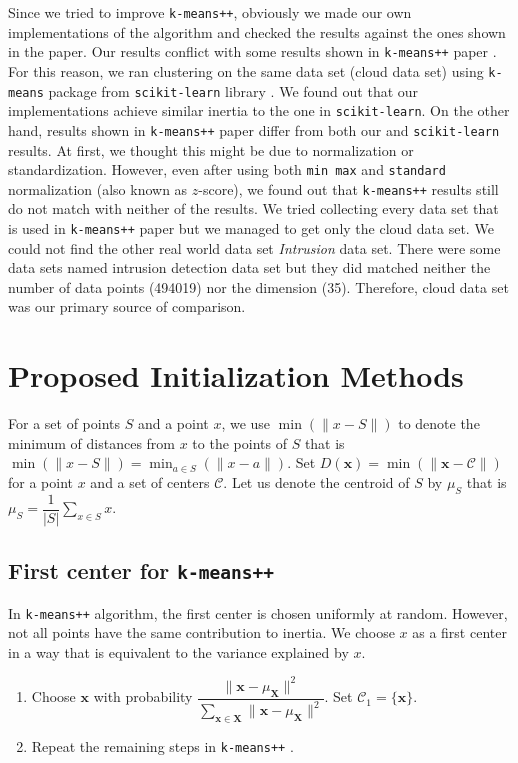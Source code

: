\documentclass[twoside, 11pt]{article}
\newcommand{\x}{\mathbf{x}}
\newcommand{\X}{\mathbf{X}}
\newcommand{\C}{\mathcal{C}}
\begin{document}
	Since we tried to improve \texttt{k-means++}, obviously we made our own implementations of the algorithm and checked the results against the ones shown in the paper. Our results conflict with some results shown in \texttt{k-means++} paper \cite{kmeans++}. For this reason, we ran clustering on the same data set (cloud data set) using \texttt{k-means} package from \texttt{scikit-learn} library \citep{sklearn}. We found out that our implementations achieve similar inertia to the one in \texttt{scikit-learn}. On the other hand, results shown in \texttt{k-means++} paper differ from both our and \texttt{scikit-learn} results. At first, we thought this might be due to normalization or standardization. However, even after using both \texttt{min max} and \texttt{standard} normalization (also known as $z$-score), we found out that \texttt{k-means++} results still do not match with neither of the results. We tried collecting every data set that is used in \texttt{k-means++} paper but we managed to get only the cloud data set. We could not find the other real world data set \textit{Intrusion} data set. There were some data sets named intrusion detection data set but they did matched neither the number of data points (494019) nor the dimension (35). Therefore, cloud data set was our primary source of comparison.
	\section{Proposed Initialization Methods}
	For a set of points $S$ and a point $x$, we use $\min(\|x-S\|)$ to denote the minimum of distances from $x$ to the points of $S$ that is $\min(\| x-S\|)=\min_{a\in S}(\| x-a\|)$. Set $D(\x)=\min(\|\x-\C\|)$ for a point $x$ and a set of centers $\C$. Let us denote the centroid of $S$ by $\mu_S$ that is $\mu_S=\dfrac{1}{|S|}\sum_{x\in S}x$.
	\subsection{First center for \texttt{k-means++}}\label{sec:first_center}
	In \texttt{k-means++} algorithm, the first center is chosen uniformly at random. However, not all points have the same contribution to inertia. We choose $x$ as a first center in a way that is equivalent to the variance explained by $x$.
	\begin{enumerate}[i]
		\item Choose $\x$ with probability $\dfrac{\|\x-\mu_{\X}\|^2}{\sum_{\x\in\X}\|\x-\mu_{\X}\|^2}$. Set $\C_1=\{\x\}$.\label{step:first_center}
		\item Repeat the remaining steps in \texttt{k-means++} \cite[Section $2.2$, Page $3$]{kmeans++}.
	\end{enumerate}
\end{document}
